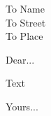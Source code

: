 \documentclass[fontsize=12pt]{scrlttr2}
\begin{document}
 \begin{letter}{To Name\\ To Street\\ To Place} 		
 
\opening{Dear...}
Text



\vfill
\closing{Yours...}
\end{letter}
\end{document}
